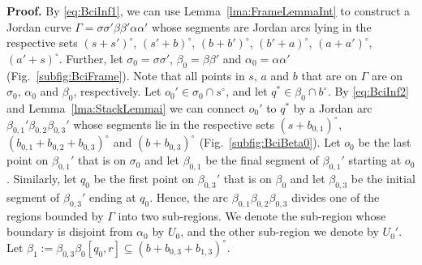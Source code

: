 \documentclass{article}
\newcommand{\ti}[2][]{{#2}^{\circ_{#1}}}
\newcommand{\qedsymbol}{\ding{113}}
\newenvironment{proof}{\par\noindent\textbf{Proof.}}{\mbox{}\hfill\qedsymbol\par\bigskip}
\begin{document}
\begin{proof}
By \eqref{eq:BciInf1}, we can use Lemma~\ref{lma:FrameLemmaInt} to construct 
a Jordan curve $\Gamma=\sigma\sigma'\beta\beta'\alpha\alpha'$ whose segments 
are Jordan arcs lying in the respective sets $(s+s')^\circ$, $(s'+b)^\circ$, 
$(b+b')^\circ$, $(b'+a)^\circ$, $(a+a')^\circ$, $(a'+s)^\circ$.
Further, let $\sigma_0=\sigma\sigma'$, $\beta_0=\beta\beta'$ and 
$\alpha_0=\alpha\alpha'$ (Fig.~\ref{subfig:BciFrame}). Note that all points in
$s$, $a$ and $b$ that are on $\Gamma$ are on $\sigma_0$, $\alpha_0$ and $\beta_0$, 
respectively. Let $o_0'\in\sigma_0 \cap\ti s$, and let $q^*\in \beta_0\cap\ti b$. 
By \eqref{eq:BciInf2} and Lemma~\ref{lma:StackLemmai} 
we can connect $o_0'$ to $q^*$ by a Jordan arc $\beta_{0,1}'\beta_{0,2}\beta_{0,3}'$ 
whose segments lie in the respective sets $\ti{(s+b_{0,1})}$, 
$\ti{(b_{0,1}+b_{0,2}+b_{0,3})}$ and $\ti{(b+b_{0,3})}$ (Fig.~\ref{subfig:BciBeta0}). 
Let $o_0$ be the last point on $\beta_{0,1}'$ that is on $\sigma_0$ and let $\beta_{0,1}$ 
be the final segment of $\beta_{0,1}'$ starting at $o_0$. Similarly, let $q_0$ 
be the first point on $\beta_{0,3}'$ that is on $\beta_0$ and let $\beta_{0,3}$
be the initial segment of $\beta_{0,3}'$ ending at $q_0$. Hence, the arc $\beta_{0,1}\beta_{0,2}
\beta_{0,3}$ divides one of the regions bounded by $\Gamma$ into two 
sub-regions. We denote the sub-region whose boundary is disjoint from $\alpha_0$ by $U_0$, and 
the other sub-region we denote by $U_0'$. 
Let $\beta_1:=\beta_{0,3}\beta_0[q_0,r]\subseteq \ti{(b+b_{0,3}+b_{1,3})}$.
\begin{figure}[h]\begin{center}
\scriptsize{
	}
\end{center}
\end{figure}
\end{proof}
\end{document}
